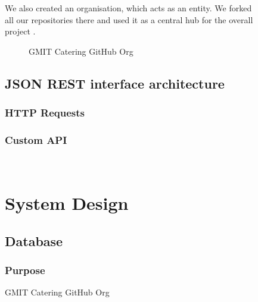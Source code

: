 \begin{figure}
  
  We also created an organisation, which acts as an entity.
  We forked all our repositories there and used it as a central hub for the overall project \cite{github_org}.
  \begin{figure}[H] 
  	\caption{GMIT Catering GitHub Org}
  	\label{fig:speciation}
  \end{figure}
  
  \pagebreak

  \section{JSON REST interface architecture}	%
  \subsection{HTTP Requests}
  \subsection{Custom API}

  ~\cite{JSON_REST_interface}


\chapter{System Design}	%
  \section{Database}
    \subsection{Purpose}


\end{figure}
